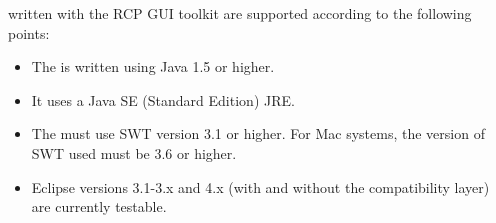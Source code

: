 \gdauts{} written with the RCP GUI toolkit are supported according to the following points:


\begin{itemize}
\item The \gdaut{} is written using Java 1.5 or higher. 
\item It uses a Java SE (Standard Edition) JRE.
\item The \gdaut{} must use SWT version 3.1 or higher. For Mac systems, the version of SWT used must be 3.6 or higher. 
\item Eclipse versions 3.1-3.x and 4.x (with and without the compatibility layer) are currently testable.
\end{itemize}
